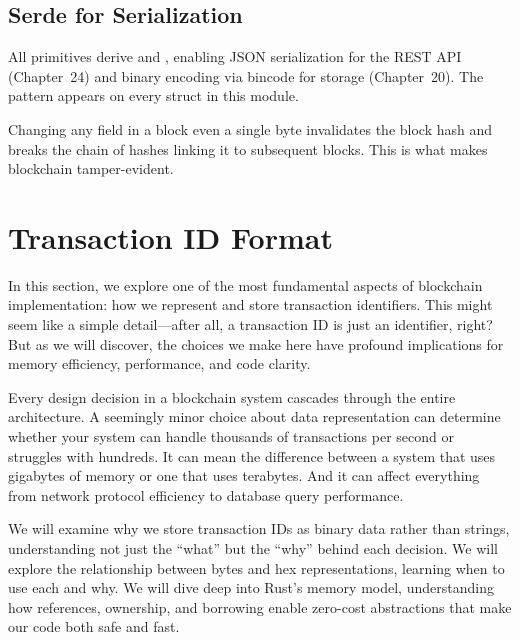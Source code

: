 \subsection{Serde for Serialization}
\label{sec:ch06-serde}

All primitives derive  and , enabling JSON serialization for the REST API (Chapter~24) and binary encoding via bincode for storage (Chapter~20). The  pattern appears on every struct in this module.

\begin{warnbox}
Changing any field in a block \textendash{} even a single byte \textendash{} invalidates the block hash and breaks the chain of hashes linking it to subsequent blocks. This is what makes blockchain tamper-evident.
\end{warnbox}

\section{Transaction ID Format}
\label{sec:ch06-transaction-id-format}

In this section, we explore one of the most fundamental aspects of blockchain implementation: how we represent and store transaction identifiers. This might seem like a simple detail---after all, a transaction ID is just an identifier, right? But as we will discover, the choices we make here have profound implications for memory efficiency, performance, and code clarity.

Every design decision in a blockchain system cascades through the entire architecture. A seemingly minor choice about data representation can determine whether your system can handle thousands of transactions per second or struggles with hundreds. It can mean the difference between a system that uses gigabytes of memory or one that uses terabytes. And it can affect everything from network protocol efficiency to database query performance.

We will examine why we store transaction IDs as binary data rather than strings, understanding not just the ``what'' but the ``why'' behind each decision. We will explore the relationship between bytes and hex representations, learning when to use each and why. We will dive deep into Rust's memory model, understanding how references, ownership, and borrowing enable zero-cost abstractions that make our code both safe and fast.

